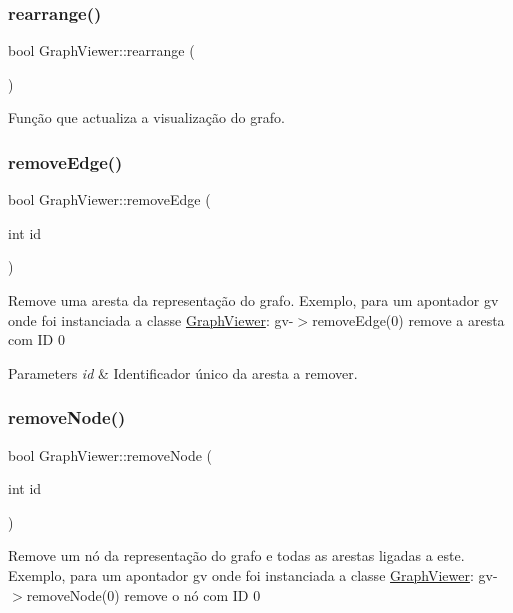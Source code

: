 \subsubsection{\texorpdfstring{rearrange()}{rearrange()}}
{\footnotesize\ttfamily bool Graph\+Viewer\+::rearrange (\begin{DoxyParamCaption}{ }\end{DoxyParamCaption})}

Função que actualiza a visualização do grafo. \mbox{\label{class_graph_viewer_a9a8ee68c7c12b373affbe4069dd95d72}} 
\subsubsection{\texorpdfstring{remove\+Edge()}{removeEdge()}}
{\footnotesize\ttfamily bool Graph\+Viewer\+::remove\+Edge (\begin{DoxyParamCaption}\item[{int}]{id }\end{DoxyParamCaption})}

Remove uma aresta da representação do grafo. Exemplo, para um apontador gv onde foi instanciada a classe \hyperlink{class_graph_viewer}{Graph\+Viewer}\+: gv-\/$>$remove\+Edge(0) remove a aresta com ID 0


\begin{DoxyParams}{Parameters}
{\em id} & Identificador único da aresta a remover. \\
\hline
\end{DoxyParams}
\mbox{\label{class_graph_viewer_a0c418639bb911eb827cabf895915f775}} 
\subsubsection{\texorpdfstring{remove\+Node()}{removeNode()}}
{\footnotesize\ttfamily bool Graph\+Viewer\+::remove\+Node (\begin{DoxyParamCaption}\item[{int}]{id }\end{DoxyParamCaption})}

Remove um nó da representação do grafo e todas as arestas ligadas a este. Exemplo, para um apontador gv onde foi instanciada a classe \hyperlink{class_graph_viewer}{Graph\+Viewer}\+: gv-\/$>$remove\+Node(0) remove o nó com ID 0


